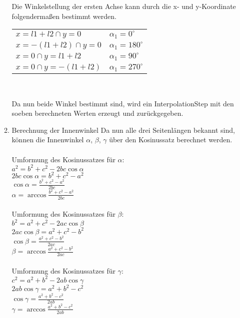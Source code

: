 \begin{itemize}
\begin{enumerate}
Die Winkelstellung der ersten Achse kann durch die x- und y-Koordinate folgendermaßen bestimmt werden.\\
\begin{center}
\begin{tabular}{p{5cm}p{3cm}}
$ x = l1+l2 \cap y = 0 $ & $ \alpha_1 = 0^\circ $\\
$ x = -(l1+l2) \cap y = 0 $ & $ \alpha_1 = 180^\circ $\\ 
$ x = 0 \cap y = l1+l2 $ & $ \alpha_1 = 90^\circ $\\
$ x = 0 \cap y = -(l1+l2) $ & $ \alpha_1 = 270^\circ $\\
\end{tabular}
\\
\end{center}
Da nun beide Winkel bestimmt sind, wird ein InterpolationStep mit den soeben berechneten Werten erzeugt und zurückgegeben.
\item Berechnung der Innenwinkel
Da nun alle drei Seitenlängen bekannt sind, können die Innenwinkel $\alpha$, $\beta$, $\gamma$ über den Kosinussatz berechnet werden.\\
\\
Umformung des Kosinussatzes für $\alpha:$\\
$ a^2 = b^2 + c^2 - 2bc \cos \alpha $\\
$ 2bc \cos \alpha = b^2 + c^2 - a^2 $\\
$ \cos \alpha = \frac{b^2 + c^2 - a^2}{2bc} $\\
$ \alpha = \arccos \frac{b^2 + c^2 - a^2}{2bc} $\\
\\
Umformung des Kosinussatzes für $\beta$:\\
$ b^2 = a^2 + c^2 - 2ac \cos \beta $\\
$ 2ac \cos \beta = a^2 + c^2 - b^2 $\\
$ \cos \beta = \frac{a^2 + c^2 - b^2}{2ac} $\\
$ \beta = \arccos \frac{a^2 + c^2 - b^2}{2ac} $\\
\\
Umformung des Kosinussatzes für $\gamma$:\\
$ c^2 = a^2 + b^2 - 2ab \cos \gamma $\\
$ 2ab \cos \gamma = a^2 + b^2 - c^2 $\\
$ \cos \gamma = \frac{a^2 + b^2 - c^2}{2ab} $\\
$ \gamma = \arccos \frac{a^2 + b^2 - c^2}{2ab} $\\
\\

\end{enumerate}
\end{itemize}
